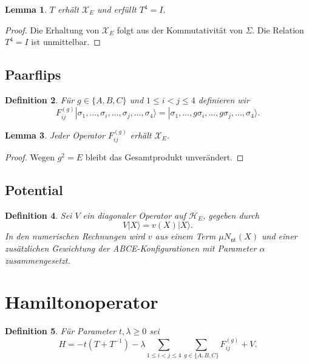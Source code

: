 \documentclass[11pt,a4paper]{article}
\newtheorem{definition}{Definition}[section]
\newtheorem{lemma}[definition]{Lemma}
\newcommand{\SigmaBM}{\Sigma}
\newcommand{\XE}{\mathcal X_E}
\newcommand{\HE}{\mathcal H_E}
\begin{document}
	\begin{lemma}
		\(T\) erhält \(\XE\) und erfüllt \(T^4=I\).
	\end{lemma}
	
	\begin{proof}
		Die Erhaltung von \(\XE\) folgt aus der Kommutativität von \(\SigmaBM\). Die Relation \(T^4=I\) ist unmittelbar.
	\end{proof}
	
	\subsection{Paarflips}
	
	\begin{definition}
		Für \(g\in\{A,B,C\}\) und \(1\le i<j\le 4\) definieren wir
		\[
		F_{ij}^{(g)}
		|\sigma_1,\dots,\sigma_i,\dots,\sigma_j,\dots,\sigma_4\rangle
		=
		|\sigma_1,\dots,g\sigma_i,\dots,g\sigma_j,\dots,\sigma_4\rangle.
		\]
	\end{definition}
	
	\begin{lemma}
		Jeder Operator \(F_{ij}^{(g)}\) erhält \(\XE\).
	\end{lemma}
	
	\begin{proof}
		Wegen \(g^2=E\) bleibt das Gesamtprodukt unverändert.
	\end{proof}
	
	\subsection{Potential}
	
	\begin{definition}
		Sei \(V\) ein diagonaler Operator auf \(\HE\), gegeben durch
		\[
		V|X\rangle=v(X)|X\rangle.
		\]
		In den numerischen Rechnungen wird \(v\) aus einem Term \(\mu N_{\mathrm{nt}}(X)\) und einer zusätzlichen Gewichtung der ABCE-Konfigurationen mit Parameter \(\alpha\) zusammengesetzt.
	\end{definition}
	
	\section{Hamiltonoperator}
	
	\begin{definition}
		Für Parameter \(t,\lambda\ge 0\) sei
		\[
		H
		=
		-t(T+T^{-1})
		-\lambda\sum_{1\le i<j\le 4}\sum_{g\in\{A,B,C\}}F_{ij}^{(g)}
		+V.
		\]
	\end{definition}
	
\end{document}
